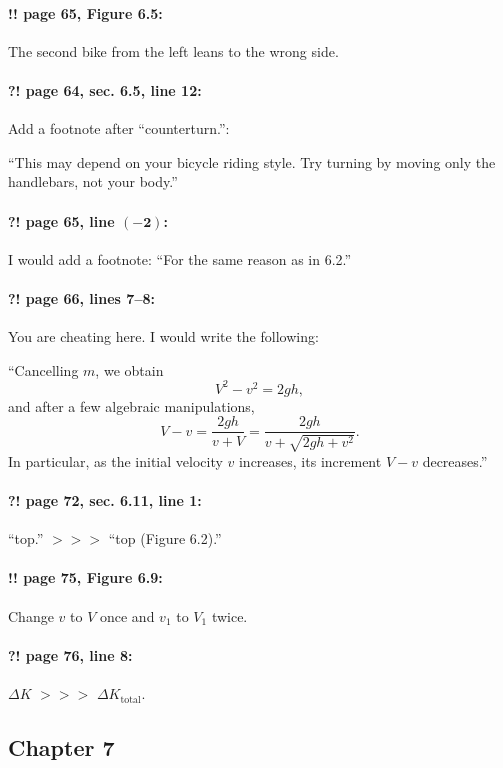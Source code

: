 \documentclass[twoside]{article}
\begin{document}
\paragraph{!! page 65, Figure 6.5:} The second bike from the left leans to the wrong side.

\paragraph{?! page 64, sec. 6.5, line 12:} Add a footnote after “counterturn.”:

“This may depend on your bicycle riding style. Try turning by moving only the handlebars, not your body.”

\paragraph{?! page 65, line $\bm{(-2)}$:} I would add a footnote: “For the same reason as in 6.2.”

\paragraph{?! page 66, lines 7--8:} You are cheating here. I would write the following:

“Cancelling $m$, we obtain
\[
V^2 - v^2 = 2gh,
\]
and after a few algebraic manipulations,
\[
V - v = \frac{2gh}{v + V} = \frac{2gh}{v + \sqrt{2gh + v^2}}.
\]
In particular, as the initial velocity $v$ increases, its increment $V - v$ decreases.”

\paragraph{?! page 72, sec. 6.11, line 1:} “top.” $>\!>\!>$ “top (Figure 6.2).”

\paragraph{!! page 75, Figure 6.9:} Change $v$ to $V$ once and $v_1$ to $V_1$ twice.

\paragraph{?! page 76, line 8:} $\Delta K$ $>\!>\!>$ $\Delta K_{\mathrm{total}}$.

\subsection*{Chapter 7}
\end{document}
